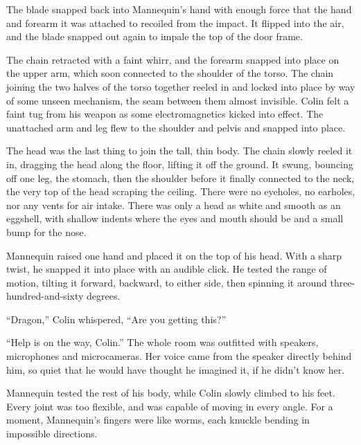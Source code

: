 The blade snapped back into Mannequin's hand with enough force that the hand and forearm it was attached to recoiled from the impact.  It flipped into the air, and the blade snapped out again to impale the top of the door frame.



The chain retracted with a faint whirr, and the forearm snapped into place on the upper arm, which soon connected to the shoulder of the torso.  The chain joining the two halves of the torso together reeled in and locked into place by way of some unseen mechanism, the seam between them almost invisible.  Colin felt a faint tug from his weapon as some electromagnetics kicked into effect.  The unattached arm and leg flew to the shoulder and pelvis and snapped into place.



The head was the last thing to join the tall, thin body.  The chain slowly reeled it in, dragging the head along the floor, lifting it off the ground.  It swung, bouncing off one leg, the stomach, then the shoulder before it finally connected to the neck, the very top of the head scraping the ceiling.  There were no eyeholes, no earholes, nor any vents for air intake.  There was only a head as white and smooth as an eggshell, with shallow indents where the eyes and mouth should be and a small bump for the nose.



Mannequin raised one hand and placed it on the top of his head.  With a sharp twist, he snapped it into place with an audible click.  He tested the range of motion, tilting it forward, backward, to either side, then spinning it around three-hundred-and-sixty degrees.



``Dragon,'' Colin whispered, ``Are you getting this?''



``Help is on the way, Colin.''  The whole room was outfitted with speakers, microphones and microcameras.  Her voice came from the speaker directly behind him, so quiet that he would have thought he imagined it, if he didn't know her.



Mannequin tested the rest of his body, while Colin slowly climbed to his feet.  Every joint was too flexible, and was capable of moving in every angle.  For a moment, Mannequin's fingers were like worms, each knuckle bending in impossible directions.



